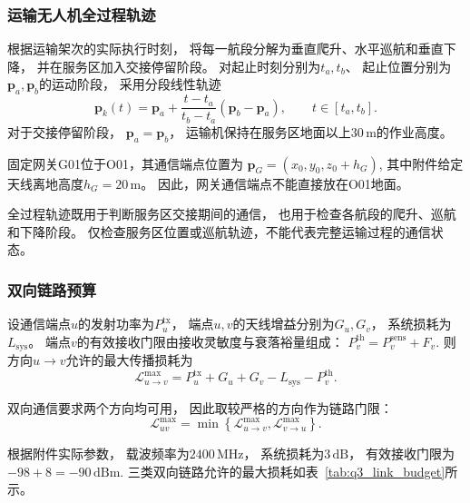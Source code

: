 \documentclass[bwprint]{gmcmthesis}
\begin{document}
\subsubsection{运输无人机全过程轨迹}

根据运输架次的实际执行时刻，
将每一航段分解为垂直爬升、水平巡航和垂直下降，
并在服务区加入交接停留阶段。
对起止时刻分别为$t_a,t_b$、
起止位置分别为$\boldsymbol{p}_a,\boldsymbol{p}_b$的运动阶段，
采用分段线性轨迹
\begin{equation}
    \boldsymbol{p}_k(t)
    =
    \boldsymbol{p}_a
    +
    \frac{t-t_a}{t_b-t_a}
    \left(\boldsymbol{p}_b-\boldsymbol{p}_a\right),
    \qquad t\in[t_a,t_b].
    \label{eq:q3_trajectory}
\end{equation}
对于交接停留阶段，
$\boldsymbol{p}_a=\boldsymbol{p}_b$，
运输机保持在服务区地面以上$30\,\mathrm{m}$的作业高度。

固定网关G01位于O01，其通信端点位置为
\(\boldsymbol{p}_{G} = (x_0,y_0,z_0+h_G)\),
其中附件给定天线离地高度$h_G=20\,\mathrm{m}$。
因此，网关通信端点不能直接放在O01地面。

全过程轨迹既用于判断服务区交接期间的通信，
也用于检查各航段的爬升、巡航和下降阶段。
仅检查服务区位置或巡航轨迹，不能代表完整运输过程的通信状态。

\subsubsection{双向链路预算}

设通信端点$u$的发射功率为$P_u^{\mathrm{tx}}$，
端点$u,v$的天线增益分别为$G_u,G_v$，
系统损耗为$L_{\mathrm{sys}}$。
端点$v$的有效接收门限由接收灵敏度与衰落裕量组成：
\(P_v^{\mathrm{th}} = P_v^{\mathrm{sens}}+F_v\).
则方向$u\to v$允许的最大传播损耗为
\begin{equation}
    \mathcal{L}_{u\to v}^{\max}
    =
    P_u^{\mathrm{tx}}
    +G_u+G_v
    -L_{\mathrm{sys}}
    -P_v^{\mathrm{th}}.
\end{equation}

双向通信要求两个方向均可用，
因此取较严格的方向作为链路门限：
\begin{equation}
    \mathcal{L}_{uv}^{\max}
    =
    \min\left\{
    \mathcal{L}_{u\to v}^{\max},
    \mathcal{L}_{v\to u}^{\max}
    \right\}.
    \label{eq:q3_bidirectional_budget}
\end{equation}

根据附件实际参数，
载波频率为$2400\,\mathrm{MHz}$，
系统损耗为$3\,\mathrm{dB}$，
有效接收门限为
\(-98+8=-90\,\mathrm{dBm}\).
三类双向链路允许的最大损耗如表~\ref{tab:q3_link_budget}所示。
\end{document}
